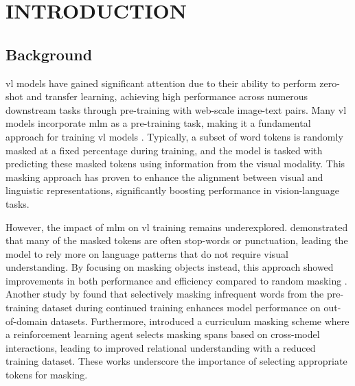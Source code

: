 \setlength{\parindent}{0in}
\setlength{\parskip}{1.5mm}
\setlength{\baselineskip}{1.6em}

\chapter{INTRODUCTION}
\section{Background}
\acrfull{vl} models have gained significant attention due to their ability to perform zero-shot and transfer learning, achieving high performance across numerous downstream tasks through pre-training with web-scale image-text pairs.
Many \acrshort{vl} models incorporate \acrfull{mlm} as a pre-training task, making it a fundamental approach for training \acrshort{vl} models \cite{albef, mplug, uniter, beit-3}.
Typically, a subset of word tokens is randomly masked at a fixed percentage during training, and the model is tasked with predicting these masked tokens using information from the visual modality.
This masking approach has proven to enhance the alignment between visual and linguistic representations, significantly boosting performance in vision-language tasks.

However, the impact of \acrshort{mlm} on \acrshort{vl} training remains underexplored.
 demonstrated that many of the masked tokens are often stop-words or punctuation, leading the model to rely more on language patterns that do not require visual understanding.
By focusing on masking objects instead, this approach showed improvements in both performance and efficiency compared to random masking \cite{mask_object}.
Another study by  found that selectively masking infrequent words from the pre-training dataset during continued training enhances model performance on out-of-domain datasets.
Furthermore,  introduced a curriculum masking scheme where a reinforcement learning agent selects masking spans based on cross-model interactions, leading to improved relational understanding with a reduced training dataset.
These works underscore the importance of selecting appropriate tokens for masking.

